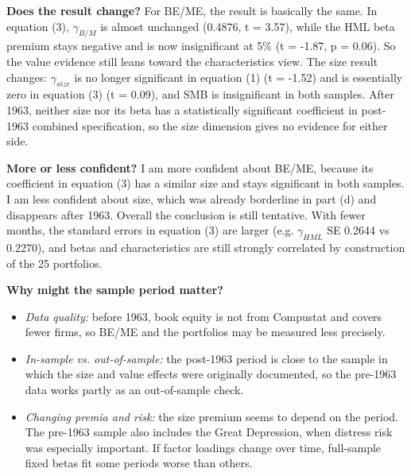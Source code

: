 \documentclass[11pt,letterpaper]{article}
\begin{document}
\textbf{Does the result change?} For BE/ME, the result is basically the same. In equation (3), \(\gamma_{B/M}\) is almost unchanged (0.4876, t = 3.57), while the HML beta premium stays negative and is now insignificant at 5\% (t = -1.87, p = 0.06). So the value evidence still leans toward the characteristics view. The size result changes: \(\gamma_{size}\) is no longer significant in equation (1) (t = -1.52) and is essentially zero in equation (3) (t = 0.09), and SMB is insignificant in both samples. After 1963, neither size nor its beta has a statistically significant coefficient in post-1963 combined specification, so the size dimension gives no evidence for either side.

\textbf{More or less confident?} I am more confident about BE/ME, because its coefficient in equation (3) has a similar size and stays significant in both samples. I am less confident about size, which was already borderline in part (d) and disappears after 1963. Overall the conclusion is still tentative. With fewer months, the standard errors in equation (3) are larger (e.g. \(\gamma_{HML}\) SE 0.2644 vs 0.2270), and betas and characteristics are still strongly correlated by construction of the 25 portfolios.

\textbf{Why might the sample period matter?}

\begin{itemize}
\item
  \emph{Data quality:} before 1963, book equity is not from Compustat and covers fewer firms, so BE/ME and the portfolios may be measured less precisely.
\item
  \emph{In-sample vs. out-of-sample:} the post-1963 period is close to the sample in which the size and value effects were originally documented, so the pre-1963 data works partly as an out-of-sample check.
\item
  \emph{Changing premia and risk:} the size premium seems to depend on the period. The pre-1963 sample also includes the Great Depression, when distress risk was especially important. If factor loadings change over time, full-sample fixed betas fit some periods worse than others.
\end{itemize}
\end{document}
